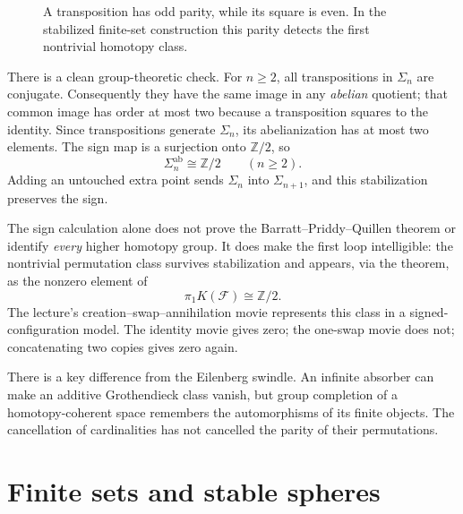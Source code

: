 \begin{figure}[H]
\centering
{}
\caption{A transposition has odd parity, while its square is even. In the stabilized finite-set construction this parity detects the first nontrivial homotopy class.}
\end{figure}

There is a clean group-theoretic check. For $n\ge2$, all transpositions in $\Sigma_n$ are conjugate. Consequently they have the same image in any \emph{abelian} quotient; that common image has order at most two because a transposition squares to the identity. Since transpositions generate $\Sigma_n$, its abelianization has at most two elements. The sign map is a surjection onto $\mathbb Z/2$, so
\[
 \boxed{\Sigma_n^{\mathrm{ab}}\cong\mathbb Z/2\qquad(n\ge2).}
\]
Adding an untouched extra point sends $\Sigma_n$ into $\Sigma_{n+1}$, and this stabilization preserves the sign.

The sign calculation alone does not prove the Barratt--Priddy--Quillen theorem or identify \emph{every} higher homotopy group. It does make the first loop intelligible: the nontrivial permutation class survives stabilization and appears, via the theorem, as the nonzero element of
\[
 \pi_1K(\mathcal F)\cong\mathbb Z/2.
\]
The lecture's creation--swap--annihilation movie represents this class in a signed-configuration model. The identity movie gives zero; the one-swap movie does not; concatenating two copies gives zero again.

There is a key difference from the Eilenberg swindle. An infinite absorber can make an additive Grothendieck class vanish, but group completion of a homotopy-coherent space remembers the automorphisms of its finite objects. The cancellation of cardinalities has not cancelled the parity of their permutations.


\section{Finite sets and stable spheres}


